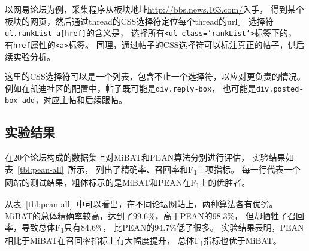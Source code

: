 以网易论坛为例，采集程序从板块地址\url{http://bbs.news.163.com/}入手，
得到某个板块的网页，然后通过thread的CSS选择符定位每个thread的url。
选择符\texttt{ul.rankList a[href]}的含义是，
选择所有\texttt{<ul class='rankList'>}标签下的，
有\texttt{href}属性的\texttt{<a>}标签。
同理，通过帖子的CSS选择符可以标注真正的帖子，供后续实验分析。

这里的CSS选择符可以是一个列表，包含不止一个选择符，以应对更负责的情况。
例如在凯迪社区的配置中，帖子既可能是\texttt{div.reply-box}，
也可能是\texttt{div.posted-box-add}，对应主帖和后续跟帖。

\subsection{实验结果}

在20个论坛构成的数据集上对MiBAT和PEAN算法分别进行评估，
实验结果如表~\ref{tbl:pean-all}~所示，
列出了精确率、召回率和F\textsubscript{1}三项指标。
每一行代表一个网站的测试结果，粗体标示的是MiBAT和PEAN在F\textsubscript{1}上的优胜者。

从表~\ref{tbl:pean-all}~中可以看出，在不同论坛网站上，两种算法各有优劣。
MiBAT的总体精确率较高，达到了99.6\%，高于PEAN的98.3\%，
但却牺牲了召回率，导致总体F\textsubscript{1}只有84.6\%，
比PEAN的94.7\%低了很多。
实验结果表明，PEAN相比于MiBAT在召回率指标上有大幅度提升，
总体F\textsubscript{1}指标也优于MiBAT。

